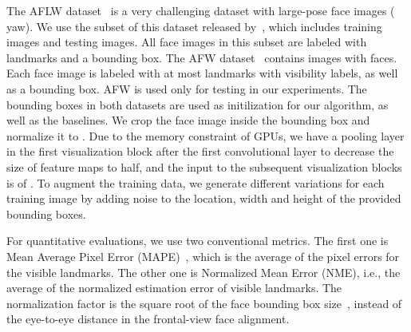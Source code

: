 \begin{table}[t!]\small
\caption{\small Number and size of convolutional filters in each visualization block. For all blocks, the two fully connected layers have the same length of  and .}\figvspace\vspace{-3mm}
\begin{center}
\end{center}
\label{table:VBdetail}\vspace{-10mm}
\end{table}
\vspace{-1mm}
\vspace{-2mm}
The AFLW dataset~\cite{kostinger2011annotated} is a very challenging dataset with large-pose face images ( yaw). 
We use the subset of this dataset released by~\cite{jourabloo2016large}, which includes  training images  and  testing images. 
All face images in this subset are labeled with  landmarks and a bounding box.
The AFW dataset~\cite{zhu2012face} contains  images with  faces. 
Each face image is labeled with at most  landmarks with visibility labels, as well as a bounding box. 
AFW is used only for testing in our experiments. 
The bounding boxes in both datasets are used as initilization for our algorithm, as well as the baselines. 
We crop the face image inside the bounding box and normalize it to . 
Due to the memory constraint of GPUs, we have a pooling layer in the first visualization block after the first convolutional layer to decrease the size of feature maps to half, and the input to the subsequent visualization blocks is of .
To augment the training data, we generate  different variations for each training image by adding noise to the location, width and height of the provided bounding boxes.


For quantitative evaluations, we use two conventional metrics. 
The first one is Mean Average Pixel Error (MAPE)~\cite{yu2013pose}, which is the average of the pixel errors for the visible landmarks. The other one is Normalized Mean Error (NME), i.e., the average of the normalized estimation error of visible landmarks.
The normalization factor is the square root of the face bounding box size~\cite{jourabloo2015pose}, instead of the eye-to-eye distance in the frontal-view face alignment.


